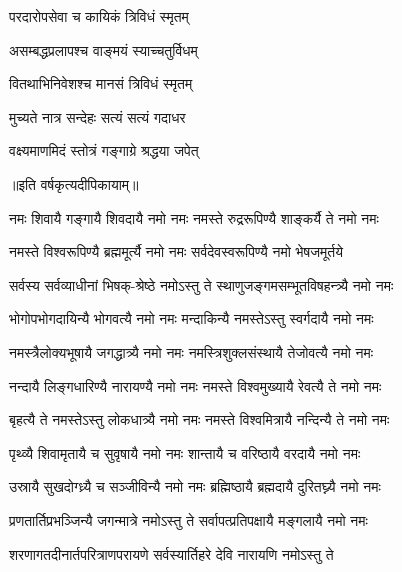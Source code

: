 


{परदारोपसेवा च कायिकं त्रिविधं स्मृतम्}

{असम्बद्धप्रलापश्च वाङ्मयं स्याच्चतुर्विधम्}

{वितथाभिनिवेशश्च मानसं त्रिविधं स्मृतम्}

{मुच्यते नात्र सन्देहः सत्यं सत्यं गदाधर}

{वक्ष्यमाणमिदं स्तोत्रं गङ्गाग्रे श्रद्धया जपेत्}

॥इति वर्षकृत्यदीपिकायाम्॥

\closesub


\twolineshloka
{नमः शिवायै गङ्गायै शिवदायै नमो नमः}
{नमस्ते रुद्ररूपिण्यै शाङ्कर्यै ते नमो नमः}%

\twolineshloka
{नमस्ते विश्वरूपिण्यै ब्रह्ममूर्त्यै नमो नमः}
{सर्वदेवस्वरूपिण्यै नमो भेषजमूर्तये}%

\twolineshloka
{सर्वस्य सर्वव्याधीनां भिषक्-श्रेष्ठे नमोऽस्तु ते}
{स्थाणुजङ्गमसम्भूतविषहन्त्र्यै नमो नमः}%

\twolineshloka
{भोगोपभोगदायिन्यै भोगवत्यै नमो नमः}
{मन्दाकिन्यै नमस्तेऽस्तु स्वर्गदायै नमो नमः}%

\twolineshloka
{नमस्त्रैलोक्यभूषायै जगद्धात्र्यै नमो नमः}
{नमस्त्रिशुक्लसंस्थायै तेजोवत्यै नमो नमः}%

\twolineshloka
{नन्दायै लिङ्गधारिण्यै नारायण्यै नमो नमः}
{नमस्ते विश्वमुख्यायै रेवत्यै ते नमो नमः}%

\twolineshloka
{बृहत्यै ते नमस्तेऽस्तु लोकधात्र्यै नमो नमः}
{नमस्ते विश्वमित्रायै नन्दिन्यै ते नमो नमः}%

\twolineshloka
{पृथ्व्यै शिवामृतायै च सुवृषायै नमो नमः}
{शान्तायै च वरिष्ठायै वरदायै नमो नमः}%

\twolineshloka
{उस्रायै सुखदोग्ध्र्यै च सञ्जीविन्यै नमो नमः}
{ब्रह्मिष्ठायै ब्रह्मदायै दुरितघ्न्यै नमो नमः}

\twolineshloka
{प्रणतार्तिप्रभञ्जिन्यै जगन्मात्रे नमोऽस्तु ते}%
{सर्वापत्प्रतिपक्षायै मङ्गलायै नमो नमः}%

\twolineshloka
{शरणागतदीनार्तपरित्राणपरायणे}
{सर्वस्यार्तिहरे देवि नारायणि नमोऽस्तु ते}%

